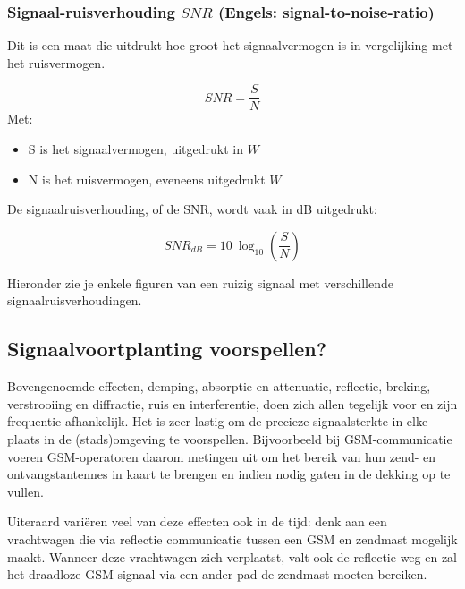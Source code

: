 \subsubsection{Signaal-ruisverhouding $SNR$ (Engels: signal-to-noise-ratio)}

Dit is een maat die uitdrukt hoe groot het signaalvermogen is in vergelijking met het ruisvermogen. 

\begin{equation*}
    SNR = \frac{S}{N}
\end{equation*}
Met: 
\begin{itemize}
    \item S is het signaalvermogen, uitgedrukt in $W$
    \item N is het ruisvermogen, eveneens uitgedrukt $W$
\end{itemize}

De signaalruisverhouding, of de SNR, wordt vaak in dB uitgedrukt:

\begin{equation*}
    SNR_{dB} = 10 ~ \log_{10} \left( \frac{S}{N} \right)
\end{equation*}

Hieronder zie je enkele figuren van een ruizig signaal met verschillende signaalruisverhoudingen.


\subsection{Signaalvoortplanting voorspellen?}

Bovengenoemde effecten, demping, absorptie en attenuatie, reflectie, breking, verstrooiing en diffractie, ruis en interferentie, doen zich allen tegelijk voor en zijn frequentie-afhankelijk. Het is zeer lastig om de precieze signaalsterkte in elke plaats in de (stads)omgeving te voorspellen. Bijvoorbeeld bij GSM-communicatie voeren GSM-operatoren daarom metingen uit om het bereik van hun zend- en ontvangstantennes in kaart te brengen en indien nodig gaten in de dekking op te vullen. 

Uiteraard vari\"eren veel van deze effecten ook in de tijd: denk aan een vrachtwagen die via reflectie communicatie tussen een GSM en zendmast mogelijk maakt. Wanneer deze vrachtwagen zich verplaatst, valt ook de reflectie weg en zal het draadloze GSM-signaal via een ander pad de zendmast moeten bereiken.

